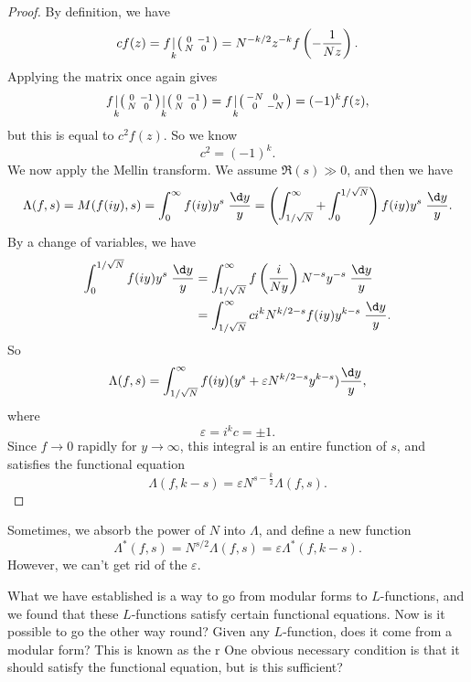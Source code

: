 \documentclass[a4paper]{article}
\begin{document}
\begin{proof}
  By definition, we have
  \[
    c f(z) =
    f\underset{k}{|}
    \begin{psmallmatrix}
      0 & -1\\
      N & 0
    \end{psmallmatrix} = N^{-k/2} z^{-k} f\left(-\frac{1}{Nz}\right).
  \]
  Applying the matrix once again gives
  \[
    f\underset{k}{|}
    \begin{psmallmatrix}
      0 & -1\\
      N & 0
    \end{psmallmatrix}\underset{k}{|}
    \begin{psmallmatrix}
      0 & -1\\
      N & 0
    \end{psmallmatrix}
    =
    f\underset{k}{|}
    \begin{psmallmatrix}
      -N & 0\\
      0 & -N
    \end{psmallmatrix}
    = (-1)^k f(z),
  \]
  but this is equal to $c^2 f(z)$. So we know
  \[
    c^2 = (-1)^k.
  \]
  We now apply the Mellin transform. We assume $\Re(s) \gg 0$, and then we have
  \[
    \Lambda(f, s) = M(f(iy), s) = \int_0^\infty f(iy) y^s\;\frac{\d y}{y} = \left(\int_{1/\sqrt{N}}^{\infty} + \int_0^{1/\sqrt{N}}\right) f(iy) y^s\;\frac{\d y}{y}.
  \]
  By a change of variables, we have
  \begin{align*}
    \int_0^{1/\sqrt{N}} f(iy) y^s\; \frac{\d y}{y} &= \int_{1/\sqrt{N}}^\infty f\left(\frac{i}{Ny}\right) N^{-s}y^{-s} \;\frac{\d y}{y} \\
    &= \int_{1/\sqrt{N}}^\infty c i^k N^{k/2 - s} f(iy) y^{k - s} \;\frac{\d y}{y}.
  \end{align*}
  So
  \[
    \Lambda(f, s) = \int_{1/\sqrt{N}}^\infty f(iy) (y^s + \varepsilon N^{k/2 - s} y^{k - s}) \frac{\d y}{y},
  \]
  where
  \[
    \varepsilon = i^k c = \pm 1.
  \]
  Since $f\to 0$ rapidly for $y \to \infty$, this integral is an entire function of $s$, and satisfies the functional equation
  \[
    \Lambda(f, k - s) = \varepsilon N^{s - \frac{k}{2}} \Lambda (f, s).
  \]
\end{proof}
Sometimes, we absorb the power of $N$ into $\Lambda$, and define a new function
\[
  \Lambda^*(f, s) = N^{s/2} \Lambda(f, s) = \varepsilon \Lambda^*(f, k - s).
\]
However, we can't get rid of the $\varepsilon$.

What we have established is a way to go from modular forms to $L$-functions, and we found that these $L$-functions satisfy certain functional equations. Now is it possible to go the other way round? Given any $L$-function, does it come from a modular form? This is known as the r One obvious necessary condition is that it should satisfy the functional equation, but is this sufficient?
\end{document}
